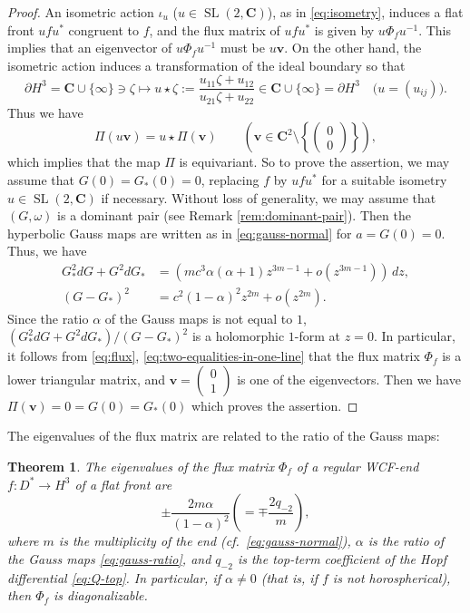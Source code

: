 \documentclass[a4paper]{amsart}
\theoremstyle{plain}
\newtheorem{theorem}{Theorem}[section]
\theoremstyle{remark}
\numberwithin{equation}{section}
\begin{document}
\begin{proof}
 An isometric action $\iota_{u}$ ($u\in{\operatorname{SL}}(2,{\boldsymbol{C}})$), 
 as in \eqref{eq:isometry}, 
 induces a flat front $ufu^*$ congruent to $f$,
 and the flux matrix of $ufu^*$ is given by
 $u \Phi_f u^{-1}$.  
 This implies that an eigenvector of
 $u \Phi_f u^{-1}$ must be $u{\boldsymbol{{v}}}$.
 On the other hand, the isometric action induces
 a transformation of the ideal boundary so that 
 \[
   \partial H^3={\boldsymbol{C}}\cup\{\infty\}\ni \zeta\mapsto
     u\star \zeta:=
         \frac{u_{11}\zeta+u_{12}}{               u_{21}\zeta+u_{22}} \in 
      {\boldsymbol{C}}\cup \{\infty\}=\partial H^3 \quad 
         \bigl(u=(u_{ij})\bigr).
 \]
 Thus we have
 \[
    \Pi(u{\boldsymbol{{v}}})=u\star \Pi({\boldsymbol{{v}}})\qquad 
         \left({\boldsymbol{{v}}}\in {\boldsymbol{C}}^2\setminus \left
\{\begin{pmatrix} 0\\ 0\end{pmatrix} \right\}\right),
 \]
 which implies that the map $\Pi$ is equivariant.
 So to prove the assertion, we may 
 assume that $G(0)=G_*(0)=0$, replacing $f$ by $ufu^*$
 for a suitable isometry $u\in {\operatorname{SL}}(2,{\boldsymbol{C}})$ if necessary.
 Without loss of generality,
 we may assume that $(G,\omega)$ is a dominant pair
 (see Remark \ref{rem:dominant-pair}).
 Then the hyperbolic Gauss maps are written as in \eqref{eq:gauss-normal} 
 for $a=G(0)=0$.
 Thus, we have
 \begin{align}
    G_*^2 dG+G^2 dG_*&=
      \left(mc^3\alpha(\alpha+1)z^{3m-1}+o(z^{3m-1})\right)\,dz,
  \label{eq:numerator}\\
    (G-G_*)^2&=c^2(1-\alpha)^2z^{2m}+o(z^{2m}).
  \label{eq:denominator}
 \end{align}
 Since the ratio $\alpha$ of the Gauss maps is not equal to $1$,
 $(G_*^2 dG+G^2 dG_*)/(G-G_*)^2$
 is a holomorphic  $1$-form at $z=0$. 
 In particular, 
 it follows from \eqref{eq:flux}, 
 \eqref{eq:two-equalities-in-one-line} that
 the flux matrix $\Phi_f$
 is a lower triangular matrix, and
 ${\boldsymbol{{v}}}=\begin{pmatrix}0\\1\end{pmatrix}$ is one of the
 eigenvectors.
 Then we have $\Pi({\boldsymbol{{v}}})=0=G(0)=G_*(0)$
 which proves the assertion.
\end{proof}
The eigenvalues of the flux matrix are related to the ratio of 
the Gauss maps:
\begin{theorem}\label{thm:flux-eigenvalue}
 The eigenvalues of the flux matrix $\Phi_f$ of a regular WCF-end 
 $f : D^* \to H^3$ of a flat front are
 \[
      \pm\frac{2m\alpha}{(1-\alpha)^2}
      \left(
         =\mp\frac{2q_{-2}}{m}
      \right),
 \]
 where  $m$ is the multiplicity of the end
 {\rm (}cf.\ \eqref{eq:gauss-normal}{\rm)}, $\alpha$ is
 the ratio of the Gauss maps \eqref{eq:gauss-ratio},
 and 
 $q_{-2}$ is the top-term coefficient of the Hopf differential
 \eqref{eq:Q-top}.
 In particular, if $\alpha\ne 0$
 {\rm (}that is, if $f$ is not horospherical\/{\rm )},
 then $\Phi_f$ is diagonalizable.
\end{theorem}
\end{document}
